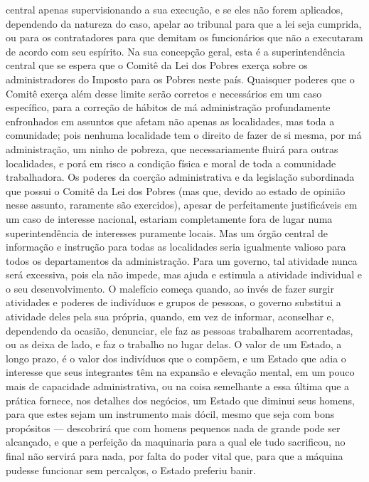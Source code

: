central apenas supervisionando a sua execução, e se eles não forem
aplicados, dependendo da natureza do caso, apelar ao tribunal para que
a lei seja cumprida, ou para os contratadores para que demitam os
funcionários que não a executaram de acordo com seu espírito. Na sua
concepção geral, esta é a superintendência central que se espera que
o Comitê da Lei dos Pobres exerça sobre os administradores do Imposto para os Pobres neste
país. Quaisquer poderes que o Comitê exerça além desse limite serão
corretos e necessários em um caso específico, para a correção de hábitos de
má administração profundamente enfronhados em assuntos que afetam
não apenas as localidades, mas toda a comunidade; pois
nenhuma localidade tem o direito de fazer de si mesma, por má
administração, um ninho de pobreza, que necessariamente fluirá para
outras localidades, e porá em risco a condição física e moral de toda
a comunidade trabalhadora. Os poderes da coerção administrativa e da
legislação subordinada que possui o Comitê da Lei dos Pobres (mas que,
devido ao estado de opinião nesse assunto, raramente são exercidos),
apesar de perfeitamente justificáveis em um caso de interesse nacional,
estariam completamente fora de lugar numa superintendência de interesses
puramente locais. Mas um órgão central de informação e instrução para
todas as localidades seria igualmente valioso para todos os
departamentos da administração. Para um governo, tal atividade
nunca será excessiva, pois ela não impede, mas ajuda e estimula a atividade
individual e o seu desenvolvimento. O malefício começa quando, ao invés
de fazer surgir atividades e poderes de indivíduos e grupos de pessoas,
o governo substitui a atividade deles pela sua própria, quando,
em vez de informar, aconselhar e, dependendo da ocasião, denunciar, ele
faz as pessoas trabalharem acorrentadas, ou as deixa de lado, e faz
o trabalho no lugar delas. O valor de um Estado, a longo prazo, é o
valor dos indivíduos que o compõem, e um Estado que adia o interesse
que seus integrantes têm na expansão e elevação mental, em um pouco
mais de capacidade administrativa, ou na coisa semelhante a essa última
que a prática fornece, nos detalhes dos negócios, um Estado que diminui
seus homens, para que estes sejam um instrumento mais dócil, mesmo que
seja com bons propósitos --- descobrirá que com homens pequenos nada de
grande pode ser alcançado, e que a perfeição da maquinaria para a qual
ele tudo sacrificou, no final não servirá para nada, por falta do poder
vital que, para que a máquina pudesse funcionar sem percalços, 
o Estado preferiu banir. 

